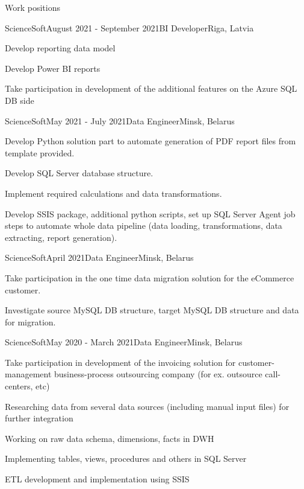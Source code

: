 \documentclass{resume} %
\begin{document}
\begin{rSection}{Work positions}
\begin{rSubsection}{ScienceSoft}{August 2021 - September 2021}{BI Developer}{Riga, Latvia}
\item Develop reporting data model
\item Develop Power BI reports
\item Take participation in development of the additional features on the Azure SQL DB side
\end{rSubsection}

\begin{rSubsection}{ScienceSoft}{May 2021 - July 2021}{Data Engineer}{Minsk, Belarus}
\item Develop Python solution part to automate generation of PDF report files from template provided.
\item Develop SQL Server database structure.
\item Implement required calculations and data transformations.
\item Develop SSIS package, additional python scripts, set up SQL Server Agent job steps to automate whole data pipeline (data loading, transformations, data extracting, report generation).
\end{rSubsection}

\begin{rSubsection}{ScienceSoft}{April 2021}{Data Engineer}{Minsk, Belarus}
\item Take participation in the one time data migration solution for the eCommerce customer.
\item Investigate source MySQL DB structure, target MySQL DB structure and data for migration.
\end{rSubsection}

\begin{rSubsection}{ScienceSoft}{May 2020 - March 2021}{Data Engineer}{Minsk, Belarus}
\item Take participation in development of the invoicing solution for customer-management business-process outsourcing company (for ex. outsource call-centers, etc)
\item Researching data from several data sources (including manual input files) for further integration
\item Working on raw data schema, dimensions, facts in DWH
\item Implementing tables, views, procedures and others in SQL Server
\item ETL development and implementation using SSIS
\end{rSubsection}


\end{rSection}
\end{document}
